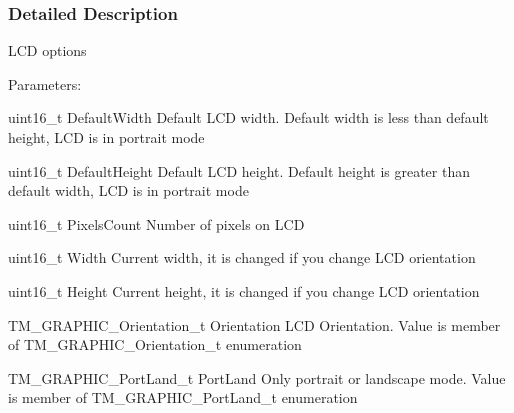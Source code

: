 \subsubsection{Detailed Description}
L\+C\+D options

Parameters\+:
\begin{DoxyItemize}
\item uint16\+\_\+t Default\+Width Default L\+C\+D width. Default width is less than default height, L\+C\+D is in portrait mode
\item uint16\+\_\+t Default\+Height Default L\+C\+D height. Default height is greater than default width, L\+C\+D is in portrait mode
\item uint16\+\_\+t Pixels\+Count Number of pixels on L\+C\+D
\item uint16\+\_\+t Width Current width, it is changed if you change L\+C\+D orientation
\item uint16\+\_\+t Height Current height, it is changed if you change L\+C\+D orientation
\item T\+M\+\_\+\+G\+R\+A\+P\+H\+I\+C\+\_\+\+Orientation\+\_\+t Orientation L\+C\+D Orientation. Value is member of T\+M\+\_\+\+G\+R\+A\+P\+H\+I\+C\+\_\+\+Orientation\+\_\+t enumeration
\item T\+M\+\_\+\+G\+R\+A\+P\+H\+I\+C\+\_\+\+Port\+Land\+\_\+t Port\+Land Only portrait or landscape mode. Value is member of T\+M\+\_\+\+G\+R\+A\+P\+H\+I\+C\+\_\+\+Port\+Land\+\_\+t enumeration 
\end{DoxyItemize}